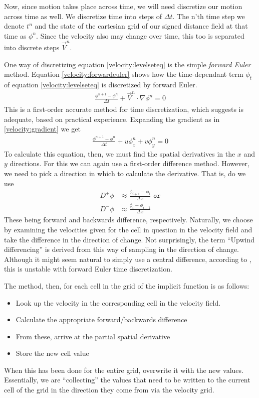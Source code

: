 Now, since motion takes place across time, we will need discretize our
motion across time as well. We discretize time into steps of $\Delta
t$. The n'th time step we denote $t^n$ and the state of the cartesian
grid of our signed distance field at that time as $\phi^n$. Since the
velocity also may change over time, this too is separated into
discrete steps $\vec{V}^n$.

One way of discretizing equation \ref{velocity:levelseteq} is the
simple \emph{forward Euler} method. Equation
\vref{velocity:forwardeuler} shows how the time-dependant term
$\phi_t$ of equation \ref{velocity:levelseteq} is discretized by
forward Euler.
\begin{align}
  \label{velocity:forwardeuler}
  \frac{\phi^{n+1}-\phi^n}{\Delta t}+\vec{V}^n\cdot\nabla\phi^n = 0
\end{align}
This is a first-order accurate method for time discretization, which
 suggests is adequate, based on practical
experience.  Expanding the gradient as in \vref{velocity:gradient} we
get
\begin{align}
  \frac{\phi^{n+1}-\phi^n}{\Delta t}+u\phi_{x}^n + v\phi_{y}^n = 0
\end{align}
To calculate this equation, then, we must find the spatial derivatives
in the $x$ and $y$ directions. For this we can again use a first-order
difference method. However, we need to pick a direction in which to
calculate the derivative. That is, do we use
\begin{align}\label{eq:fweuler}
  D^+\phi &\approx  \frac{\phi_{i+1} - \phi_i}{\Delta x} \texttt{ or}\\
  D^-\phi &\approx  \frac{\phi_i - \phi_{i-1}}{\Delta x}
\end{align}
These being forward and backwards difference, respectively. Naturally,
we choose by examining the velocities given for the cell in question
in the velocity field and take the difference in the direction of
change. Not surprisingly, the term ``Upwind differencing'' is derived
from this way of sampling in the direction of change.  Although it
might seem natural to simply use a central difference, according to
, this is unstable with forward Euler time
discretization.

The method, then, for each cell in the grid of the implicit function
is as follows:
\begin{itemize}
\item Look up the velocity in the corresponding cell in the velocity
  field.
\item Calculate the appropriate forward/backwards difference
\item From these, arrive at the partial spatial derivative
\item Store the new cell value
\end{itemize}
When this has been done for the entire grid, overwrite it with the new
values.  Essentially, we are ``collecting'' the values that need to be
written to the current cell of the grid in the direction they come
from via the velocity grid.

